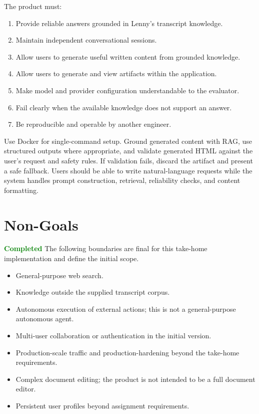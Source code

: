 \documentclass[11pt]{article}
\newcommand{\status}[1]{\textcolor{Green}{\textbf{#1}}}
\begin{document}
The product must:
\begin{enumerate}
  \item Provide reliable answers grounded in Lenny's transcript knowledge.
  \item Maintain independent conversational sessions.
  \item Allow users to generate useful written content from grounded knowledge.
  \item Allow users to generate and view artifacts within the application.
  \item Make model and provider configuration understandable to the evaluator.
  \item Fail clearly when the available knowledge does not support an answer.
  \item Be reproducible and operable by another engineer.
\end{enumerate}

\begin{decisionbox}
Use Docker for single-command setup. Ground generated content with RAG, use structured outputs where appropriate, and validate generated HTML against the user's request and safety rules. If validation fails, discard the artifact and present a safe fallback. Users should be able to write natural-language requests while the system handles prompt construction, retrieval, reliability checks, and content formatting.
\end{decisionbox}

\section{Non-Goals}\label{sec:non-goals}

\begin{statusbox}{\status{Completed}}
The following boundaries are final for this take-home implementation and define the initial scope.
\end{statusbox}

\begin{itemize}
  \item General-purpose web search.
  \item Knowledge outside the supplied transcript corpus.
  \item Autonomous execution of external actions; this is not a general-purpose autonomous agent.
  \item Multi-user collaboration or authentication in the initial version.
  \item Production-scale traffic and production-hardening beyond the take-home requirements.
  \item Complex document editing; the product is not intended to be a full document editor.
  \item Persistent user profiles beyond assignment requirements.
\end{itemize}
\end{document}
